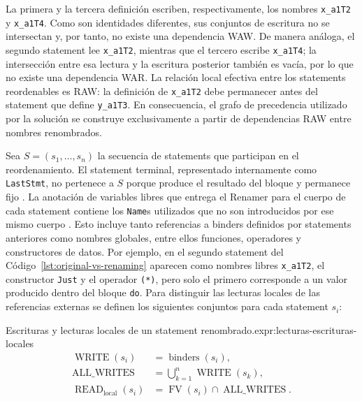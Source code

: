 La primera y la tercera definición escriben, respectivamente, los nombres \texttt{x\_a1T2} y \texttt{x\_a1T4}. Como son identidades diferentes, sus conjuntos de escritura no se intersectan y, por tanto, no existe una dependencia WAW. De manera análoga, el segundo statement lee \texttt{x\_a1T2}, mientras que el tercero escribe \texttt{x\_a1T4}; la intersección entre esa lectura y la escritura posterior también es vacía, por lo que no existe una dependencia WAR. La relación local efectiva entre los statements reordenables es RAW: la definición de \texttt{x\_a1T2} debe permanecer antes del statement que define \texttt{y\_a1T3}. En consecuencia, el grafo de precedencia utilizado por la solución se construye exclusivamente a partir de dependencias RAW entre nombres renombrados.

Sea $S=(s_1,\ldots,s_n)$ la secuencia de statements que participan en el reordenamiento. El statement terminal, representado internamente como \texttt{LastStmt}, no pertenece a $S$ porque produce el resultado del bloque y permanece fijo \cite[p.~95]{MarlowPJKM2016}. La anotación de variables libres que entrega el Renamer para el cuerpo de cada statement contiene los \texttt{Name}s utilizados que no son introducidos por ese mismo cuerpo \cite{GHCRenamerSources2026}. Esto incluye tanto referencias a binders definidos por statements anteriores como nombres globales, entre ellos funciones, operadores y constructores de datos. Por ejemplo, en el segundo statement del Código~\ref{lst:original-vs-renaming} aparecen como nombres libres \texttt{x\_a1T2}, el constructor \texttt{Just} y el operador \verb|(*)|, pero solo el primero corresponde a un valor producido dentro del bloque \texttt{do}. Para distinguir las lecturas locales de las referencias externas se definen los siguientes conjuntos para cada statement $s_i$:

\begin{ReportExpression}{Escrituras y lecturas locales de un statement renombrado.}{expr:lecturas-escrituras-locales}
\[
\begin{aligned}
\operatorname{WRITE}(s_i) &= \operatorname{binders}(s_i),\\
\operatorname{ALL\_WRITES} &= \bigcup_{k=1}^{n}\operatorname{WRITE}(s_k),\\
\operatorname{READ}_{\mathrm{local}}(s_i)
  &= \operatorname{FV}(s_i)\cap\operatorname{ALL\_WRITES}.
\end{aligned}
\]
\end{ReportExpression}

